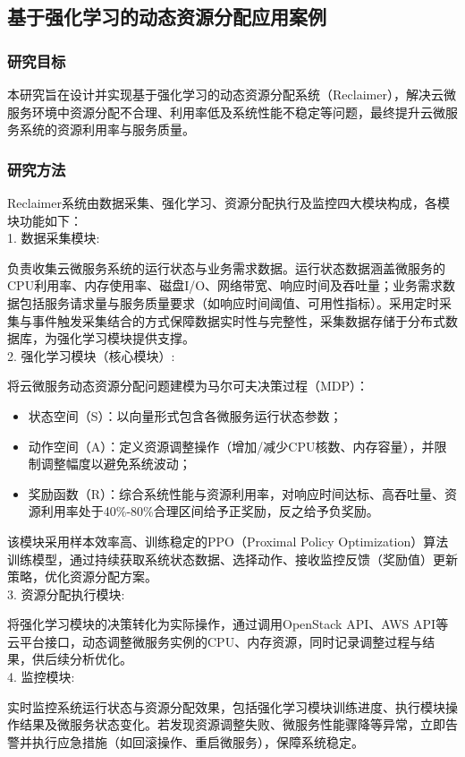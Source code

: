 \documentclass[lang=cn,11pt,a4paper,cite=number]{elegantpaper}
\begin{document}
\subsection{基于强化学习的动态资源分配应用案例}
\subsubsection{研究目标}
本研究旨在设计并实现基于强化学习的动态资源分配系统（Reclaimer），解决云微服务环境中资源分配不合理、利用率低及系统性能不稳定等问题，最终提升云微服务系统的资源利用率与服务质量。

\subsubsection{研究方法}
Reclaimer系统由数据采集、强化学习、资源分配执行及监控四大模块构成，各模块功能如下：\\
1. 数据采集模块:

负责收集云微服务系统的运行状态与业务需求数据。运行状态数据涵盖微服务的CPU利用率、内存使用率、磁盘I/O、网络带宽、响应时间及吞吐量；业务需求数据包括服务请求量与服务质量要求（如响应时间阈值、可用性指标）。采用定时采集与事件触发采集结合的方式保障数据实时性与完整性，采集数据存储于分布式数据库，为强化学习模块提供支撑。\\
2. 强化学习模块（核心模块）:

将云微服务动态资源分配问题建模为马尔可夫决策过程（MDP）：
\begin{itemize}
  \item {状态空间（S）}：以向量形式包含各微服务运行状态参数；
  \item {动作空间（A）}：定义资源调整操作（增加/减少CPU核数、内存容量），并限制调整幅度以避免系统波动；
  \item {奖励函数（R）}：综合系统性能与资源利用率，对响应时间达标、高吞吐量、资源利用率处于40\%-80\%合理区间给予正奖励，反之给予负奖励。
\end{itemize}

该模块采用样本效率高、训练稳定的PPO（Proximal Policy Optimization）算法训练模型，通过持续获取系统状态数据、选择动作、接收监控反馈（奖励值）更新策略，优化资源分配方案。\\
3. 资源分配执行模块:

将强化学习模块的决策转化为实际操作，通过调用OpenStack API、AWS API等云平台接口，动态调整微服务实例的CPU、内存资源，同时记录调整过程与结果，供后续分析优化。\\
4. 监控模块:

实时监控系统运行状态与资源分配效果，包括强化学习模块训练进度、执行模块操作结果及微服务状态变化。若发现资源调整失败、微服务性能骤降等异常，立即告警并执行应急措施（如回滚操作、重启微服务），保障系统稳定。
\end{document}
